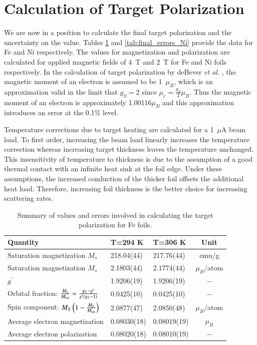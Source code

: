 \documentclass[preprint,12pt]{elsarticle}
\begin{document}
{\section{Calculation of Target Polarization}\label{sec:final_calc}
We are now in a position to calculate the final target polarization and the uncertainty on the value. Tables \ref{tab:final_errors_Fe} and \ref{tab:final_errors_Ni} provide the data for Fe and Ni respectively. The values for magnetization and polarization are calculated for applied magnetic fields of 4~T and 2~T for Fe and Ni foils respectively. In the calculation of target polarization by deBever {\it et al.} \cite{deBever1997}, the magnetic moment of an electron is assumed to be 1~$\mu_B$, which is an approximation valid in the limit that $g_{S}=2$ since $\mu_e=\frac{g_S}{2}\mu_B$. Thus the magnetic moment of an electron is approximately 1.00116$\mu_B$ and this approximation introduces an error at the 0.1\% level. %


Temperature corrections due to target heating are calculated for a 1~$\mu$A beam load. To first order, increasing the beam load linearly increases the temperature correction whereas increasing target thickness leaves the temperature unchanged. This insensitivity of temperature to thickness is due to the assumption of a good thermal contact with an infinite heat sink at the foil edge. Under these assumptions, the increased conduction of the thicker foil offsets the additional heat load. Therefore, increasing foil thickness is the better choice for increasing scattering rates. 
\begin{table}[h]
\caption{\label{tab:final_errors_Fe}Summary of values and errors involved in calculating the target polarization for Fe foils.}
\begin{center}
\begin{tabular}{|l|l|l|c|}\hline
Quantity&T=294 K&T=306 K&Unit\\\hline
Saturation magnetization $M_s$ &218.04(44)&217.76(44)&emu/g\\
Saturation magnetization $M_s$&2.1803(44)&2.1774(44)&$\mu_B$/atom\\
$g^{\prime}$&1.9206(19)&1.9206(19)&$-$\\
Orbital fraction: $\frac{M_{L}}{M_{\rm tot}}=\frac{g_{S}-g^\prime}{g^\prime(g_{S}-1)}$&0.0425(10)&0.0425(10)&$-$\\
Spin component: $M_S\left(1-\frac{M_{L}}{M_{\rm tot}}\right)$&2.0877(47)&2.0850(48)&$\mu_B$/atom\\
Average electron magnetization&0.08030(18)&0.08019(19)&$\mu_B$\\
Average electron polarization&0.08020(18)&0.08010(19)&$-$\\\hline
\end{tabular}
\end{center}
\end{table}


}
\end{document}
